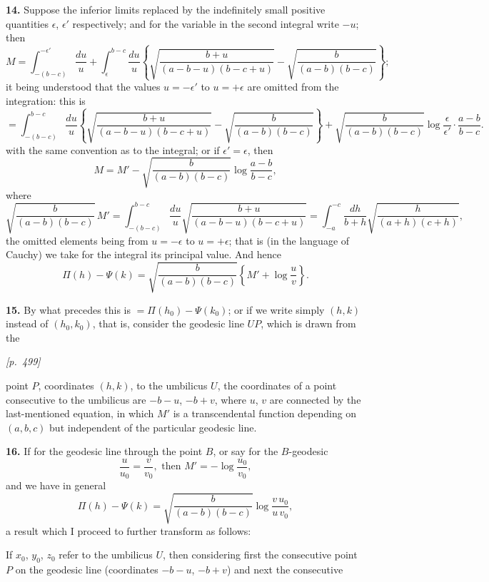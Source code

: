 \documentclass[11pt]{article}
\begin{document}
\textbf{14.} Suppose the inferior limits replaced by the indefinitely
small positive quantities $\epsilon$, $\epsilon'$ respectively; and for the
variable in the second integral write $-u$; then
\[
M=\int_{-(b-c)}^{-\epsilon'}\frac{du}{u}+\int_{\epsilon}^{b-c}\frac{du}{u}
\left\{\sqrt{\frac{b+u}{(a-b-u)(b-c+u)}}-\sqrt{\frac{b}{(a-b)(b-c)}}\right\};
\]
it being understood that the values $u=-\epsilon'$ to $u=+\epsilon$ are
omitted from the integration: this is
\[
=\int_{-(b-c)}^{b-c}\frac{du}{u}\left\{\sqrt{\frac{b+u}{(a-b-u)(b-c+u)}}
-\sqrt{\frac{b}{(a-b)(b-c)}}\right\}+\sqrt{\frac{b}{(a-b)(b-c)}}\log\frac{\epsilon}{\epsilon'}\cdot\frac{a-b}{b-c}.
\]
with the same convention as to the integral; or if $\epsilon'=\epsilon$,
then
\[
M=M'-\sqrt{\frac{b}{(a-b)(b-c)}}\log\frac{a-b}{b-c},
\]
where
\[
\sqrt{\frac{b}{(a-b)(b-c)}}\,M'
=\int_{-(b-c)}^{b-c}\frac{du}{u}\sqrt{\frac{b+u}{(a-b-u)(b-c+u)}}
=\int_{-a}^{-c}\frac{dh}{b+h}\sqrt{\frac{h}{(a+h)(c+h)}},
\]
the omitted elements being from $u=-\epsilon$ to $u=+\epsilon$; that is
(in the language of Cauchy) we take for the integral its principal value.
And hence
\[
\Pi(h)-\Psi(k)=\sqrt{\frac{b}{(a-b)(b-c)}}\left\{M'+\log\frac{u}{v}\right\}.
\]

\textbf{15.} By what precedes this is $=\Pi(h_{0})-\Psi(k_{0})$; or if we
write simply $(h,k)$ instead of $(h_{0},k_{0})$, that is, consider the
geodesic line $UP$, which is drawn from the

\medskip

\noindent\textit{[p.~499]}

\medskip

\noindent
point $P$, coordinates $(h,k)$, to the umbilicus $U$, the coordinates of
a point consecutive to the umbilicus are $-b-u$, $-b+v$, where $u$, $v$
are connected by the last-mentioned equation, in which $M'$ is a
transcendental function depending on $(a,b,c)$ but independent of the
particular geodesic line.

\textbf{16.} If for the geodesic line through the point $B$, or say for
the $B$-geodesic
\[
\frac{u}{u_{0}}=\frac{v}{v_{0}},\text{ then } M'=-\log\frac{u_{0}}{v_{0}},
\]
and we have in general
\[
\Pi(h)-\Psi(k)=\sqrt{\frac{b}{(a-b)(b-c)}}\log\frac{v\,u_{0}}{u\,v_{0}},
\]
a result which I proceed to further transform as follows:

If $x_{0}$, $y_{0}$, $z_{0}$ refer to the umbilicus $U$, then considering
first the consecutive point $P$ on the geodesic line (coordinates $-b-u$,
$-b+v$) and next the consecutive

\medskip
\end{document}
